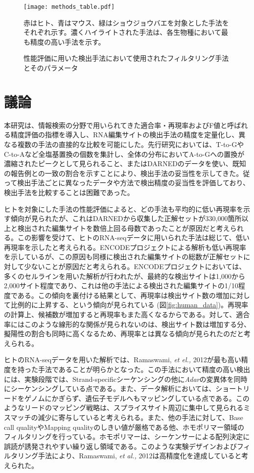 \begin{landscape}
	\begin{figure}[!h]
		\centering
		\texttt{[image: methods\_table.pdf]}
		\caption{性能評価に用いた検出手法において使用されたフィルタリング手法とそのパラメータ}
		\begin{flushleft}
			\small{赤はヒト、青はマウス、緑はショウジョウバエを対象とした手法をそれぞれ示す。濃くハイライトされた手法は、各生物種において最も精度の高い手法を示す。}
		\end{flushleft}
		\label{Fig:*****}
	\end{figure}
\end{landscape}

\section{議論}
本研究は、情報検索の分野で用いられてきた適合率・再現率およびF値と呼ばれる精度評価の指標を導入し、RNA編集サイトの検出手法の精度を定量化し、異なる複数の手法の直接的な比較を可能にした。先行研究においては、T-to-GやC-to-Aなど全塩基置換の個数を集計し、全体の分布においてA-to-Gへの置換が濃縮されたピークとして見られること、またはDARNEDのデータを使い、既知の報告例との一致の割合を示すことにより、検出手法の妥当性を示してきた。従って検出手法ごとに異なったデータや方法で検出精度の妥当性を評価しており、検出手法を比較することは困難であった。
\par
ヒトを対象にした手法の性能評価によると、どの手法も平均的に低い再現率を示す傾向が見られたが、これはDARNEDから収集した正解セットが330,000箇所以上と検出された編集サイトを数倍上回る母数であったことが原因だと考えられる。この影響を受けて、ヒトのRNA-seqデータに用いられた手法は総じて、低い再現率を示したと考えられる。ENCODEプロジェクトによる解析も低い再現率を示しているが、この原因も同様に検出された編集サイトの総数が正解セットに対して少ないことが原因だと考えられる。ENCODEプロジェクトにおいては、多くのセルラインを用いた解析が行われたが、最終的な検出サイトは1,000から2,000サイト程度であり、これは他の手法による検出された編集サイトの1/10程度である。この傾向を裏付ける結果として、再現率は検出サイト数の増加に対して比例的に上昇する、という傾向が見られている (図\ref{fig:human_data})。再現率の計算上、候補数が増加すると再現率もまた高くなるからである。対して、適合率にはこのような線形的な関係が見られないのは、検出サイト数は増加する分、擬陽性の割合も同時に高くなるため、再現率とは異なる傾向が見られたのだと考えられる。
\par
ヒトのRNA-seqデータを用いた解析では、Ramaswami, \textit{et el., }2012が最も高い精度を持った手法であることが明らかとなった。この手法において精度の高い検出には、実験段階では、Strand-specificシーケンシングの他に\textit{Adar}の変異体を同時にシーケンシングしている点である。また、データ解析においては、ショートリードをゲノムにかぎらず、遺伝子モデルへもマッピングしている点である。このようなリードのマッピング戦略は、スプライスサイト周辺に集中して見られるミスマッチの減少に寄与していると考えられる。また、他の手法に対して、Base call qualityやMapping qualityのしきい値が厳格である他、ホモポリマー領域のフィルタリングを行っている。ホモポリマーは、シーケンサーによる配列決定に誤読が誘発されやすい繰り返し領域である。このような実験デザインおよびフィルタリング手法により、Ramaswami, \textit{et al., }2012は高精度化を達成していると考えられた。
